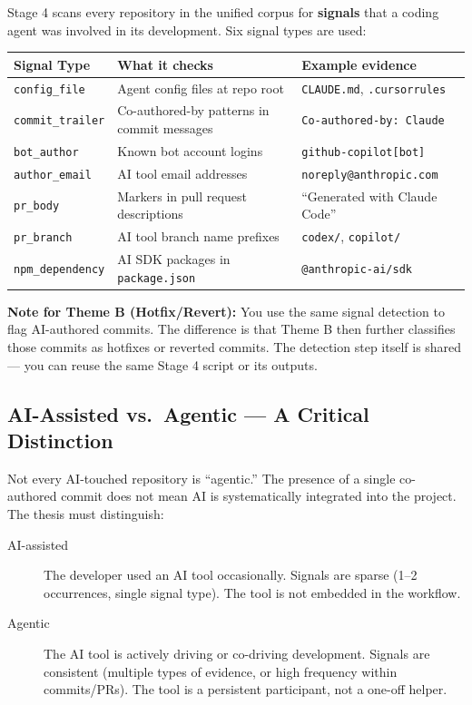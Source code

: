 \documentclass[11pt,a4paper]{article}
\begin{document}
Stage 4 scans every repository in the unified corpus for \textbf{signals} that a coding agent was involved in its development. Six signal types are used:

\begin{center}
\begin{tabular}{lll}
\toprule
\textbf{Signal Type} & \textbf{What it checks} & \textbf{Example evidence} \\
\midrule
\texttt{config\_file} & Agent config files at repo root & \texttt{CLAUDE.md}, \texttt{.cursorrules} \\
\texttt{commit\_trailer} & Co-authored-by patterns in commit messages & \texttt{Co-authored-by: Claude} \\
\texttt{bot\_author} & Known bot account logins & \texttt{github-copilot[bot]} \\
\texttt{author\_email} & AI tool email addresses & \texttt{noreply@anthropic.com} \\
\texttt{pr\_body} & Markers in pull request descriptions & ``Generated with Claude Code'' \\
\texttt{pr\_branch} & AI tool branch name prefixes & \texttt{codex/}, \texttt{copilot/} \\
\texttt{npm\_dependency} & AI SDK packages in \texttt{package.json} & \texttt{@anthropic-ai/sdk} \\
\bottomrule
\end{tabular}
\end{center}

\begin{notebox}
\textbf{Note for Theme B (Hotfix/Revert):} You use the same signal detection to flag AI-authored commits. The difference is that Theme B then further classifies those commits as hotfixes or reverted commits. The detection step itself is shared — you can reuse the same Stage 4 script or its outputs.
\end{notebox}

\subsection{AI-Assisted vs.\ Agentic — A Critical Distinction}

Not every AI-touched repository is ``agentic.'' The presence of a single co-authored commit does not mean AI is systematically integrated into the project. The thesis must distinguish:

\begin{description}
    \item[AI-assisted] The developer used an AI tool occasionally. Signals are sparse (1--2 occurrences, single signal type). The tool is not embedded in the workflow.
    \item[Agentic] The AI tool is actively driving or co-driving development. Signals are consistent (multiple types of evidence, or high frequency within commits/PRs). The tool is a persistent participant, not a one-off helper.
\end{description}
\end{document}
